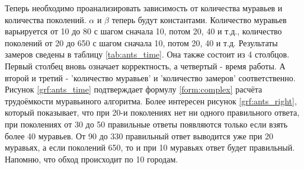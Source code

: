 \documentclass[12pt, a4paper]{report}
\begin{document}
    		Теперь необходимо проанализировать зависимость от количества муравьев и количества поколений. $\alpha$ и $\beta$ теперь будут константами. Количество муравьев варьируется от 10 до 80 с шагом сначала 10, потом 20, 40 и т.д., количество поколений от 20 до 650 с шагом сначала 10, потом 20, 40 и т.д. Результаты замеров сведены в таблицу \ref{tab:ants_time}. Она также состоит из 4 столбцов. Первый столбец вновь означает корректность, а четвертый - время работы. А второй и третий - 'количество муравьев' и 'количество замеров' соответственно. Рисунок \ref{grf:ants_time} подтверждает формулу \ref{form:complex}  расчёта трудоёмкости муравьиного алгоритма. Более интересен рисунок \ref{grf:ants_right}, который показывает, что при 20-и поколениях нет ни одного правильного ответа, при поколениях от 30 до 50 правильные ответы появляются только если взять более 40 муравьев. От 90 до 330 правильный ответ выводится уже при 20 муравьях, а если поколений 650, то и при 10 муравьях ответ будет правильный. Напомню, что обход происходит по 10 городам.
    		\newpage
\end{document}
